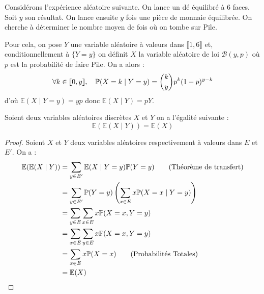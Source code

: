 \begin{example}
    Considérons l'expérience aléatoire suivante. On lance un dé équilibré à 6 faces. Soit $y$ son résultat. 
    On lance ensuite $y$ fois une pièce de monnaie équilibrée. On cherche à déterminer le nombre moyen de 
    fois où on tombe sur Pile. 

    Pour cela, on pose $Y$ une variable aléatoire à valeurs dans $ \llbracket 1, 6 \rrbracket $ et, conditionnellement 
    à $\{Y = y\}$ on définit $X$ la variable aléatoire de loi $ \mathcal{B}(y,p)$ où $p$ est la probabilité de 
    faire Pile. On a alors : 
        $$ \forall k \in \llbracket 0, y \rrbracket , \quad \mathbb{P}(X = k \mid Y = y) = \binom{k}{y} p^k (1-p)^{y-k} $$ 
    d'où $ \mathbb{E}(X \mid Y = y) = yp$ donc $ \mathbb{E}(X \mid Y) = pY$.    
\end{example}

\begin{prop}[Composition]
    Soient deux variables aléatoires discrètes $X$ et $Y$ on a l'égalité suivante : 
        $$ \mathbb{E}( \mathbb{E}(X \mid Y) ) = \mathbb{E}(X) $$  
\end{prop}

\begin{proof}
    Soient $X$ et $Y$ deux variables aléatoires respectivement à valeurs dans $E$ et $E'$. On a : 
        \begin{align*}
            \mathbb{E}( \mathbb{E}(X \mid Y) ) &= \sum_{y \in E'} \mathbb{E}(X \mid Y = y) \mathbb{P}(Y = y) \quad \quad \text{(Théorème de transfert)} \\ 
            &= \sum_{y \in E'} \mathbb{P}(Y = y) \left( \sum_{x \in E} x \mathbb{P}(X = x \mid Y = y) \right) \\ 
            &= \sum_{y \in E} \sum_{x \in E} x \mathbb{P}(X = x, Y = y) \\ 
            &= \sum_{x \in E} \sum_{y \in E} x \mathbb{P}(X = x, Y = y) \\ 
            &= \sum_{x \in E} x \mathbb{P}(X = x) \quad \quad \text{(Probabilités Totales)} \\
            &= \mathbb{E}(X) 
        \end{align*}
\end{proof}


